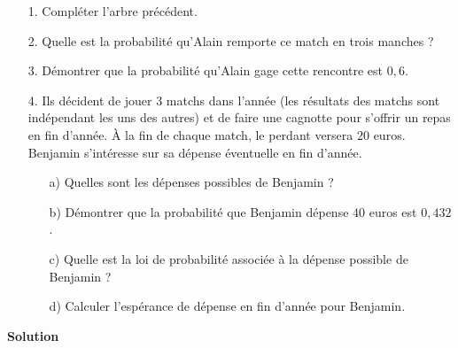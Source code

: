 \begin{itemize}
\item[1.] Compléter l'arbre précédent. \\
\item[2.] Quelle est la probabilité qu'Alain remporte ce match en trois manches ? \\
\item[3.] Démontrer que la probabilité qu'Alain gage cette rencontre est $0,6$. \\
\item[4.] Ils décident de jouer $3$ matchs dans l'année (les résultats des matchs sont indépendant les uns des autres) et de faire une cagnotte pour s'offrir un repas en fin d'année. À la fin de chaque match, le perdant versera $20$ euros. Benjamin s'intéresse sur sa dépense éventuelle en fin d'année. \\

\begin{itemize}
\item[a)] Quelles sont les dépenses possibles de Benjamin ?
\item[b)] Démontrer que la probabilité que Benjamin dépense $40$ euros est $0,432$. 
\item[c)] Quelle est la loi de probabilité associée à la dépense possible de Benjamin ? 
\item[d)] Calculer l'espérance de dépense en fin d'année pour Benjamin.
\end{itemize}
\end{itemize}

\newpage

\textbf{Solution} \\

